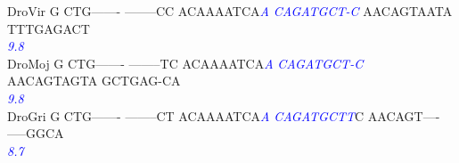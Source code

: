 \documentclass[11pt,twoside,reqno,a4paper]{article}
\begin{document}
{DroVir	G	CTG-------	--------CC	ACAAAATCA\textit{\textcolor{Blue}{A}}	\textit{\textcolor{Blue}{C}}\textit{\textcolor{Blue}{A}}\textit{\textcolor{Blue}{G}}\textit{\textcolor{Blue}{A}}\textit{\textcolor{Blue}{T}}\textit{\textcolor{Blue}{G}}\textit{\textcolor{Blue}{C}}\textit{\textcolor{Blue}{T}}\textit{\textcolor{Blue}{-}}\textit{\textcolor{Blue}{C}}	AACAGTAATA	TTTGAGACT\\
\hspace*{7\charwidth}\hspace*{1\charwidth}\hspace*{1\charwidth}\hspace*{1\charwidth}\hspace*{30\charwidth}\textit{\textcolor{Blue}{9.8}}\hspace*{1\charwidth}\hspace*{1\charwidth}\hspace*{1\charwidth}\\
DroMoj	G	CTG-------	--------TC	ACAAAATCA\textit{\textcolor{Blue}{A}}	\textit{\textcolor{Blue}{C}}\textit{\textcolor{Blue}{A}}\textit{\textcolor{Blue}{G}}\textit{\textcolor{Blue}{A}}\textit{\textcolor{Blue}{T}}\textit{\textcolor{Blue}{G}}\textit{\textcolor{Blue}{C}}\textit{\textcolor{Blue}{T}}\textit{\textcolor{Blue}{-}}\textit{\textcolor{Blue}{C}}	AACAGTAGTA	GCTGAG-CA\\
\hspace*{7\charwidth}\hspace*{1\charwidth}\hspace*{1\charwidth}\hspace*{1\charwidth}\hspace*{30\charwidth}\textit{\textcolor{Blue}{9.8}}\hspace*{1\charwidth}\hspace*{1\charwidth}\hspace*{1\charwidth}\\
DroGri	G	CTG-------	--------CT	ACAAAATCA\textit{\textcolor{Blue}{A}}	\textit{\textcolor{Blue}{C}}\textit{\textcolor{Blue}{A}}\textit{\textcolor{Blue}{G}}\textit{\textcolor{Blue}{A}}\textit{\textcolor{Blue}{T}}\textit{\textcolor{Blue}{G}}\textit{\textcolor{Blue}{C}}\textit{\textcolor{Blue}{T}}\textit{\textcolor{Blue}{T}}C	AACAGT----	-----GGCA\\
\hspace*{7\charwidth}\hspace*{1\charwidth}\hspace*{1\charwidth}\hspace*{1\charwidth}\hspace*{30\charwidth}\textit{\textcolor{Blue}{8.7}}\hspace*{1\charwidth}\hspace*{1\charwidth}\hspace*{1\charwidth}\\
}
\end{document}
